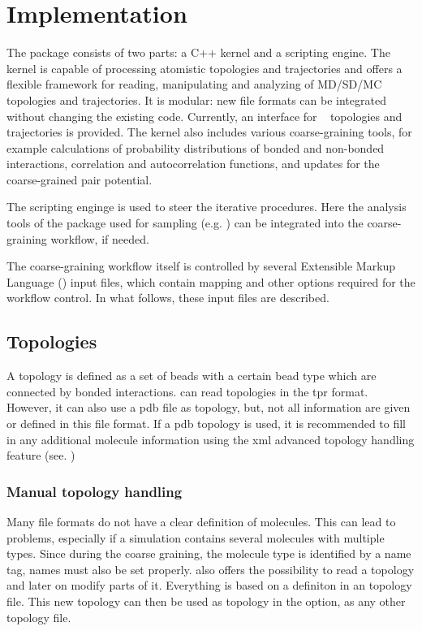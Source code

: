 \chapter{Implementation}

The package consists of two parts: a C++ kernel and a scripting engine. The kernel is capable of processing atomistic topologies and trajectories and offers a flexible framework for reading, manipulating and analyzing of MD/SD/MC topologies and trajectories. It is modular: new file formats can be integrated without changing the existing code. Currently, an interface for \gromacs~\cite{gromacs4} topologies and trajectories is provided. 
%
The kernel also includes various coarse-graining tools, for example calculations of probability distributions of bonded and non-bonded interactions, correlation and autocorrelation functions, and updates for the coarse-grained pair potential. 
 
The scripting enginge is used to steer the iterative procedures. Here the analysis tools of the package used for sampling (e.g. \gromacs) can be integrated into the coarse-graining workflow, if needed.

The coarse-graining workflow itself is controlled by several Extensible Markup Language (\xml) input files, which contain mapping and other options required for the workflow control. In what follows, these input files are described.




\section{Topologies}
A topology is defined as a set of beads with a certain bead type which are connected by bonded interactions.
\votca can read topologies in the \gromacs tpr format. However, it can also use a pdb file as topology, but, not all information are given or defined in this file format. If a pdb topology is used, it is recommended to fill in any additional molecule information using the xml advanced topology handling feature (see. )
\subsection{Manual topology handling}
\label{sec:adv_topology}
Many file formats do not have a clear definition of molecules. This can lead to problems, especially if a simulation contains several molecules with multiple types. Since during the coarse graining, the molecule type is identified by a name tag, names must also be set properly. \votca also offers the possibility to read a topology and later on modify parts of it. Everything is based on a definiton in an \xml topology file. This new \xml topology can then be used as topology in the  option, as any other topology file. 

